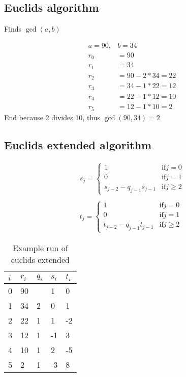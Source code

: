 
\subsection{Euclids algorithm}
Finds $\gcd(a, b)$

\begin{align*}
  a = 90,& b = 34 \\
  r_0 &= 90\\
  r_1 &= 34\\
  r_2 &= 90 - 2*34 = 22\\
  r_3 &= 34 - 1*22 = 12\\
  r_4 &= 22 - 1*12 = 10\\
  r_5 &= 12 - 1*10 = 2
\end{align*}
End because 2 divides 10, thus $\gcd(90, 34) = 2$

\subsection{Euclids extended algorithm}
\begin{align*}
  s_j = \begin{cases}
    1 &\mbox{if} j = 0\\
    0 &\mbox{if} j = 1\\
    s_{j-2} - q_{j-1}s_{j-1} &\mbox{if} j \ge 2
  \end{cases}\\ \\
  t_j = \begin{cases}
    1 &\mbox{if} j = 0\\
    0 &\mbox{if} j = 1\\
    t_{j-2} - q_{j-1}t_{j-1} &\mbox{if} j \ge 2
  \end{cases}
\end{align*}

\begin{table}[H]
  \centering
  \begin{tabular}{lllll}
    $i$ & $r_i$ & $q_i$ & $s_i$ & $t_i$ \\ \hline
    0   & 90    &       & 1     & 0     \\
    1   & 34    & 2     & 0     & 1     \\
    2   & 22    & 1     & 1     & -2    \\
    3   & 12    & 1     & -1    & 3     \\
    4   & 10    & 1     & 2     & -5    \\
    5   & 2     & 1     & -3    & 8     \\
  \end{tabular}
  \caption{Example run of euclids extended}
\end{table}


